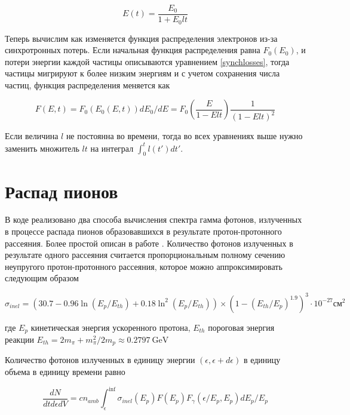 \begin{equation}
	E(t) = \frac{E_0}{1 + E_0 l t}
\end{equation}

Теперь вычислим как изменяется функция распределения электронов из-за синхротронных потерь. Если начальная функция распределения равна $F_0(E_0)$, и потери энергии каждой частицы описываются уравнением \ref{synchlosses}, тогда частицы мигрируют к более низким энергиям и с учетом сохранения числа частиц, функция распределения меняется как

\begin{equation}
	F(E,t) = F_0\left(E_0(E,t)\right) dE_0/dE = F_0\left(\frac{E}{1-E l t}\right)\frac{1}{\left(1 - E l t\right)^2}
\end{equation}

Если величина $l$ не постоянна во времени, тогда во всех уравнениях выше нужно заменить множитель $l t$ на интеграл $\int_0^t l(t')dt'$.

\section{Распад пионов}\label{PionFormulae}

В коде реализовано два способа вычисления спектра гамма фотонов, излученных в процессе распада пионов образовавшихся в результате протон-протонного рассеяния. Более простой описан в работе \cite{Kelner}. Количество фотонов излученных в результате одного рассеяния считается пропорциональным полному сечению неупругого протон-протонного рассеяния, которое можно аппроксимировать следующим образом \cite{Kafexhiu}

\begin{equation}\label{sigmainel}
	\sigma_{inel} = \left(30.7 - 0.96\ln\left(E_p/E_{th}\right) + 0.18\ln^2\left(E_p/E_{th}\right) \right)\times\left(1 - \left(E_{th}/E_p\right)^{1.9}\right)^3\cdot10^{-27} \text{см}^{2}
\end{equation}

где $E_p$ кинетическая энергия ускоренного протона, $E_{th}$ пороговая энергия реакции $E_{th} = 2m_{\pi}+m^2_{\pi}/2m_p \approx 0.2797~\text{GeV}$

Количество фотонов излученных в единицу энергии $\left(\epsilon, \epsilon+d\epsilon\right)$ в единицу объема в единицу времени равно

\begin{equation}
	\frac{dN}{dt d\epsilon dV} = c n_{amb} \int_{\epsilon}^{\inf}\sigma_{inel}(E_p)F(E_p)F_{\gamma}(\epsilon/E_p, E_p) dE_p/E_p
\end{equation} 

